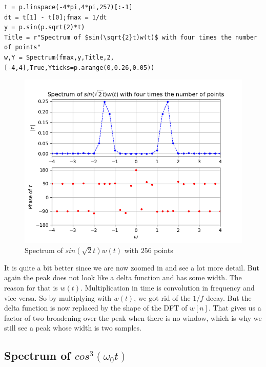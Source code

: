 \documentclass[11pt, a4paper]{article}
\begin{document}
            \begin{verbatim}
t = p.linspace(-4*pi,4*pi,257)[:-1]
dt = t[1] - t[0];fmax = 1/dt
y = p.sin(p.sqrt(2)*t)
Title = r"Spectrum of $sin(\sqrt{2}t)w(t)$ with four times the number of points"
w,Y = Spectrum(fmax,y,Title,2,[-4,4],True,Yticks=p.arange(0,0.26,0.05))
            \end{verbatim}
            \begin{figure}[!h]
                \centering
                \includegraphics[scale = 0.65]{Figure 2.png}
                \caption{Spectrum of $sin(\sqrt{2}t)w(t)$ with $256$ points}
                \label{fig:Figure 2}
            \end{figure}
        It is quite a bit better since we are now zoomed in and see a lot more
        detail. But again the peak does not look like a delta function and has some width. The reason for that is $w(t)$. Multiplication in time is convolution in frequency and vice versa. So by multiplying with $w(t)$, we got rid of the $1/f$ decay. But the delta function is now replaced by the shape of the DFT of $w[n]$. That gives us a factor of two broadening over the peak when there is no window, which is why we still see a peak whose width is two samples.
    
    \subsection{Spectrum of $cos^3(\omega_0t)$}
\end{document}

